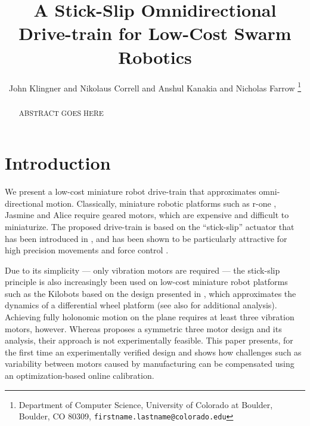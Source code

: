 \documentclass[letterpaper, 10pt, conference]{ieeeconf}
\title{\LARGE \bf
A Stick-Slip Omnidirectional Drive-train for Low-Cost Swarm Robotics
}
\author{John Klingner and Nikolaus Correll and Anshul Kanakia and Nicholas Farrow%
\thanks{Department of Computer Science,
University of Colorado at Boulder,
 Boulder, CO 80309,
{\tt\small firstname.lastname{@}colorado.edu}}%
}
\begin{document}
\maketitle


\begin{abstract}
ABSTRACT GOES HERE
\end{abstract}



\section{Introduction}
We present a low-cost miniature robot drive-train that approximates omni-directional motion. Classically, miniature robotic platforms such as r-one \cite{mclurkin2013low}, Jasmine \cite{jasmine} and Alice \cite{alice} require geared motors, which are expensive and difficult to miniaturize. The proposed drive-train is based on the ``stick-slip'' actuator that has been introduced in \cite{breguet1998stick}, and has been shown to be particularly attractive for high precision movements \cite{brufau2005micron,chu2006novel,martel2001three,martel2005fundamental,eigoli2012locomotion} and force control \cite{vartholomeos2008analysis}.   

Due to its simplicity --- only vibration motors are required --- the stick-slip principle is also increasingly been used on low-cost miniature robot platforms such as the Kilobots \cite{rubenstein2012kilobot} based on the design presented in \cite{Vartholomeos2006}, which approximates the dynamics of a differential wheel platform (see also \cite{spartali2013speed} for additional analysis). Achieving fully holonomic motion on the plane requires at least three vibration motors, however. Whereas \cite{Vartholomeos2005} proposes a symmetric three motor design and its analysis, their approach is not experimentally feasible. This paper presents, for the first time an experimentally verified design and shows how challenges such as variability between motors caused by manufacturing can be compensated using an optimization-based online calibration. 
\end{document}
